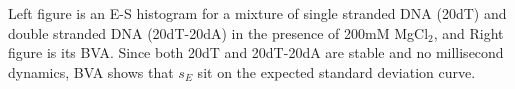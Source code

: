 \label{fig:bva_static}   Left figure is an E-S histogram for a mixture of single stranded DNA (20dT) and double stranded DNA (20dT-20dA) in the presence of 200mM MgCl$_2$, and Right figure is its BVA. Since both 20dT and 20dT-20dA are stable and no millisecond dynamics, BVA shows that $s_E$ sit on the expected standard deviation curve.